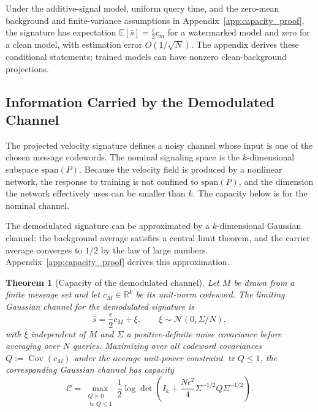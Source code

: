 \documentclass[11pt]{article}
\newtheorem{theorem}{Theorem}
\begin{document}
Under the additive-signal model, uniform query time, and the zero-mean
background and finite-variance assumptions in
Appendix~\ref{app:capacity_proof}, the signature has expectation
$\mathbb{E}[\hat{s}]=\frac{\epsilon}{2}c_m$ for a watermarked model
and zero for a clean model, with estimation error $O(1/\sqrt N)$.
The appendix derives these conditional statements; trained models can
have nonzero clean-background projections.

\subsection{Information Carried by the Demodulated Channel}

The projected velocity signature defines a noisy channel whose input is
one of the chosen message codewords. The nominal signaling space is the
$k$-dimensional subspace $\mathrm{span}(P)$. Because the velocity field
is produced by a nonlinear network, the response to training is not
confined to $\mathrm{span}(P)$, and the dimension the network
effectively uses can be smaller than $k$. The capacity below is for the
nominal channel.

The demodulated signature can be approximated by a $k$-dimensional
Gaussian channel: the background average satisfies a central limit
theorem, and the carrier average converges to $1/2$ by the law of large
numbers. Appendix~\ref{app:capacity_proof} derives this approximation.

\begin{theorem}[Capacity of the demodulated channel]
\label{thm:capacity}
Let $M$ be drawn from a finite message set and let $c_M\in\mathbb R^k$
be its unit-norm codeword. The limiting Gaussian channel for the
demodulated signature is
\begin{equation}
\hat{s} = \frac{\epsilon}{2}c_M+\xi,\qquad
\xi\sim\mathcal N(0,\Sigma/N),
\end{equation}
with $\xi$ independent of $M$ and $\Sigma$ a positive-definite noise
covariance before averaging over $N$ queries. Maximizing over all codeword covariances $Q:=\operatorname{Cov}(c_M)$ under the average unit-power constraint
$\operatorname{tr}Q\le 1$, the corresponding Gaussian channel has capacity
\begin{equation}
\mathcal{C}
=
\max_{\substack{Q\succeq 0\\ \operatorname{tr}Q\le 1}}
\frac12\log\det\!\left(I_k+
\frac{N\epsilon^2}{4}\Sigma^{-1/2}Q\Sigma^{-1/2}\right).
\end{equation}
\end{theorem}
\end{document}
